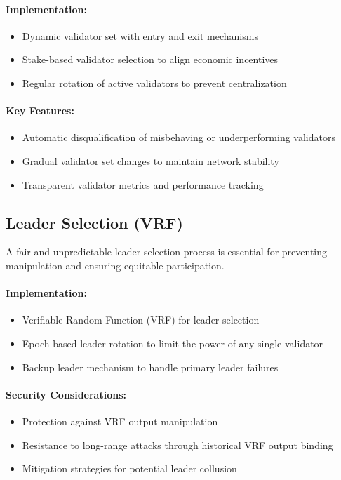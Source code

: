 \documentclass[12pt,a4paper]{article}
\begin{document}
	\paragraph{Implementation:}
	\begin{itemize}
		\item Dynamic validator set with entry and exit mechanisms
		\item Stake-based validator selection to align economic incentives
		\item Regular rotation of active validators to prevent centralization
	\end{itemize}
	
	\paragraph{Key Features:}
	\begin{itemize}
		\item Automatic disqualification of misbehaving or underperforming validators
		\item Gradual validator set changes to maintain network stability
		\item Transparent validator metrics and performance tracking
	\end{itemize}
	
	\subsection{Leader Selection (VRF)}
	A fair and unpredictable leader selection process is essential for preventing manipulation and ensuring equitable participation.
	
	\paragraph{Implementation:}
	\begin{itemize}
		\item Verifiable Random Function (VRF) for leader selection
		\item Epoch-based leader rotation to limit the power of any single validator
		\item Backup leader mechanism to handle primary leader failures
	\end{itemize}
	
	\paragraph{Security Considerations:}
	\begin{itemize}
		\item Protection against VRF output manipulation
		\item Resistance to long-range attacks through historical VRF output binding
		\item Mitigation strategies for potential leader collusion
	\end{itemize}
	
\end{document}

